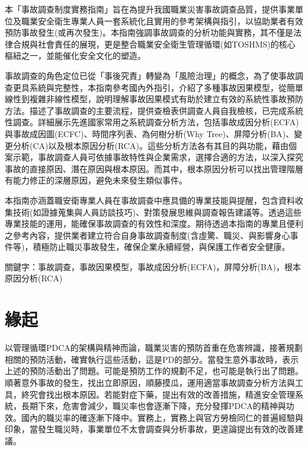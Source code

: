 \documentclass[
  letterpaper,
  DIV=11,
  numbers=noendperiod]{scrreprt}
\begin{document}
本「事故調查制度實務指南」旨在為提升我國職業災害事故調查品質，提供事業單位及職業安全衛生專業人員一套系統化且實用的參考架構與指引，以協助業者有效預防事故發生(或再次發生)。本指南強調事故調查的分析功能與實務，其不僅是法律合規與社會責任的展現，更是整合職業安全衛生管理循環(如TOSHMS)的核心樞紐之一，並能催化安全文化的塑造。

事故調查的角色定位已從「事後究責」轉變為「風險治理」的概念，為了使事故調查更具系統與完整性，本指南參考國內外指引，介紹了多種事故因果模型，從簡單線性到複雜非線性模型，說明理解事故因果模式有助於建立有效的系統性事故預防方法。描述了事故調查的主要流程，提供查檢表供調查人員自我檢核，已完成系統性調查。詳細展示先進國家常用之系統調查分析方法，包括事故成因分析(ECFA)與事故成因圖(ECFC)、時間序列表、為何樹分析(Why
Tree)、屏障分析(BA)、變更分析(CA)以及根本原因分析(RCA)。這些分析方法各有其目的與功能，藉由個案示範，事故調查人員可依據事故特性與企業需求，選擇合適的方法，以深入探究事故的直接原因、潛在原因與根本原因。而其中，根本原因分析可以找出管理階層有能力修正的深層原因，避免未來發生類似事件。

本指南亦涵蓋職安衛專業人員在事故調查中應具備的專業技能與提醒，包含資料收集技術(如證據蒐集與人員訪談技巧)、對策發展思維與調查報告建議等。透過這些專業技能的運用，能確保事故調查的有效性和深度。期待透過本指南的專業且便利之參考內容，提供業者建立符合自身事故調查制度(含虛驚、職災、與影響身心事件等)，積極防止職災事故發生，確保企業永續經營，與保護工作者安全健康。

關鍵字：事故調查，事故因果模型，事故成因分析(ECFA)，屏障分析(BA)，根本原因分析(RCA)


\chapter*{緣起}\label{ux7de3ux8d77}


以管理循環PDCA的架構與精神而論，職業災害的預防首重在危害辨識，接著規劃相關的預防活動，確實執行這些活動，這是PD的部分。當發生意外事故時，表示上述的預防活動出了問題。可能是預防工作的規劃不足，也可能是執行出了問題。順著意外事故的發生，找出立即原因，順藤摸瓜，運用適當事故調查分析方法與工具，終究會找出根本原因。若能對症下藥，提出有效的改善措施，精進安全管理系統，長期下來，危害會減少，職災率也會逐漸下降，充分發揮PDCA的精神與功效。國內的職災率的確逐漸下降中。實務上，實務上與官方勞檢同仁的普遍經驗與印象，當發生職災時，事業單位不太會調查與分析事故，更遑論提出有效的改善建議。
\end{document}
